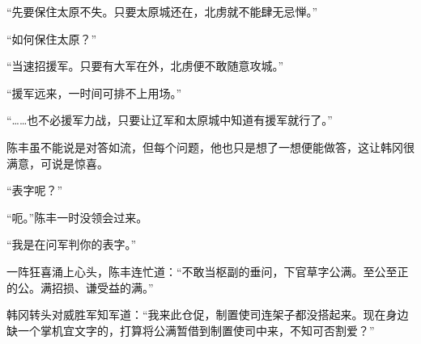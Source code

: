 “先要保住太原不失。只要太原城还在，北虏就不能肆无忌惮。”

“如何保住太原？”

“当速招援军。只要有大军在外，北虏便不敢随意攻城。”

“援军远来，一时间可排不上用场。”

“……也不必援军力战，只要让辽军和太原城中知道有援军就行了。”

陈丰虽不能说是对答如流，但每个问题，他也只是想了一想便能做答，这让韩冈很满意，可说是惊喜。

“表字呢？”

“呃。”陈丰一时没领会过来。

“我是在问军判你的表字。”

一阵狂喜涌上心头，陈丰连忙道：“不敢当枢副的垂问，下官草字公满。至公至正的公。满招损、谦受益的满。”

韩冈转头对威胜军知军道：“我来此仓促，制置使司连架子都没搭起来。现在身边缺一个掌机宜文字的，打算将公满暂借到制置使司中来，不知可否割爱？”


